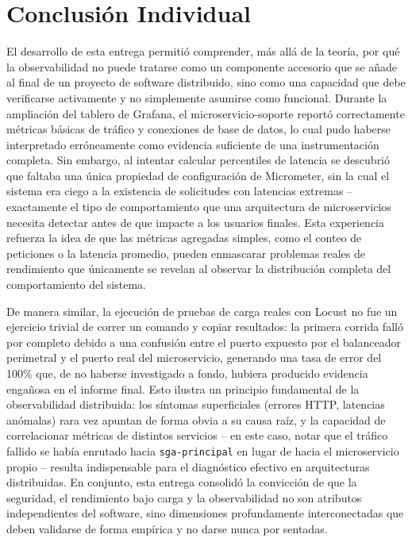 ﻿\documentclass[11pt,a4paper]{article}
\begin{document}
\section{Conclusi\'on Individual}
El desarrollo de esta entrega permiti\'o comprender, m\'as all\'a de la teor\'ia, por qu\'e la observabilidad no puede tratarse como un componente accesorio que se a\~nade al final de un proyecto de software distribuido, sino como una capacidad que debe verificarse activamente y no simplemente asumirse como funcional. Durante la ampliaci\'on del tablero de Grafana, el microservicio-soporte report\'o correctamente m\'etricas b\'asicas de tr\'afico y conexiones de base de datos, lo cual pudo haberse interpretado err\'oneamente como evidencia suficiente de una instrumentaci\'on completa. Sin embargo, al intentar calcular percentiles de latencia se descubri\'o que faltaba una \'unica propiedad de configuraci\'on de Micrometer, sin la cual el sistema era ciego a la existencia de solicitudes con latencias extremas -- exactamente el tipo de comportamiento que una arquitectura de microservicios necesita detectar antes de que impacte a los usuarios finales. Esta experiencia refuerza la idea de que las m\'etricas agregadas simples, como el conteo de peticiones o la latencia promedio, pueden enmascarar problemas reales de rendimiento que \'unicamente se revelan al observar la distribuci\'on completa del comportamiento del sistema.

De manera similar, la ejecuci\'on de pruebas de carga reales con Locust no fue un ejercicio trivial de correr un comando y copiar resultados: la primera corrida fall\'o por completo debido a una confusi\'on entre el puerto expuesto por el balanceador perimetral y el puerto real del microservicio, generando una tasa de error del 100\% que, de no haberse investigado a fondo, hubiera producido evidencia enga\~nosa en el informe final. Esto ilustra un principio fundamental de la observabilidad distribuida: los s\'intomas superficiales (errores HTTP, latencias an\'omalas) rara vez apuntan de forma obvia a su causa ra\'iz, y la capacidad de correlacionar m\'etricas de distintos servicios -- en este caso, notar que el tr\'afico fallido se hab\'ia enrutado hacia \texttt{sga-principal} en lugar de hacia el microservicio propio -- resulta indispensable para el diagn\'ostico efectivo en arquitecturas distribuidas. En conjunto, esta entrega consolid\'o la convicci\'on de que la seguridad, el rendimiento bajo carga y la observabilidad no son atributos independientes del software, sino dimensiones profundamente interconectadas que deben validarse de forma emp\'irica y no darse nunca por sentadas.



\end{document}
